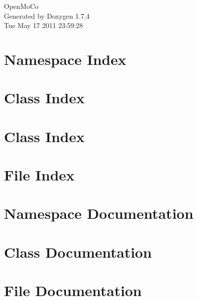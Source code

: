 \documentclass[a4paper]{book}
\begin{document}
\hypersetup{pageanchor=false}
\begin{titlepage}
\vspace*{7cm}
\begin{center}
{\Large OpenMoCo }\\
\vspace*{1cm}
{\large Generated by Doxygen 1.7.4}\\
\vspace*{0.5cm}
{\small Tue May 17 2011 23:59:28}\\
\end{center}
\end{titlepage}
\clearemptydoublepage
{}
\tableofcontents
\clearemptydoublepage
{}
\hypersetup{pageanchor=true}
\chapter{Namespace Index}

\chapter{Class Index}

\chapter{Class Index}

\chapter{File Index}

\chapter{Namespace Documentation}

\chapter{Class Documentation}







\chapter{File Documentation}















\printindex
\end{document}
